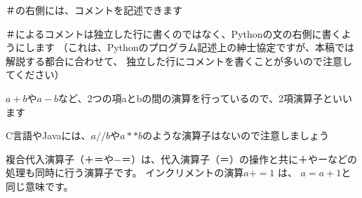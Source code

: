 \documentclass[uplatex,a4paper,11pt,oneside,openany]{jsbook}
\begin{document}
＃の右側には、コメントを記述できます

＃によるコメントは独立した行に書くのではなく、Pythonの文の右側に書くようにします
（これは、Pythonのプログラム記述上の紳士協定ですが、本稿では解説する都合に合わせて、
独立した行にコメントを書くことが多いので注意してください）



$a+b$や$a-b$など、2つの項aとbの間の演算を行っているので、2項演算子といいます

C言語やJavaには、$a//b$や$a**b$のような演算子はないので注意しましょう

複合代入演算子（＋＝や−＝）は、代入演算子（＝）の操作と共に＋やーなどの処理も同時に行う演算子です。
インクリメントの演算$a+=1$ は、 $a = a + 1$と同じ意味です。
%
\end{document}
